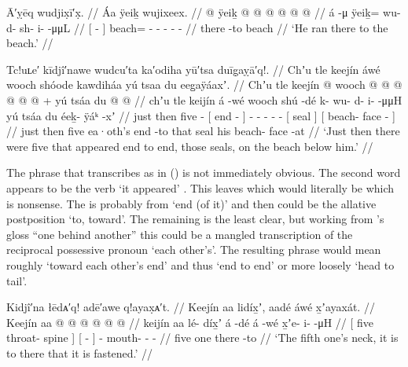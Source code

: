 \ex\label{ex:90-42-ran-down-there}%
%
\begingl
	\glpreamble	Ā′ỵēq wudjix̣ī′x̣. //
	\glpreamble	Áa ÿeiḵ wujixeex. //
	\gla	{}  @ {} {}
		ÿeiḵ @  @ {} @ {} @ {} @ {} @ {} //
	\glb	{} á -μ {}
		ÿeiḵ= wu- d- sh- i-  -μμL //
	\glc	{}[  - {}]
		beach= - - - -  - //
	\gld	{} there -to {}
		beach  {} {} {} {} {} //
	\glft	‘He ran there to the beach.’
		//
\endgl
\xe

\ex\label{ex:90-43-ran-down-there}%
%
\begingl
	\glpreamble	Tc!uʟe′ kīdjî′nawe wudcu′ta ka′odiha yū′tsa duīg̣aỵā′q!. //
	\glpreamble	Chʼu tle keejín áwé wooch shóode kawdiháa yú tsaa du eeg̱aÿáaxʼ. //
	\gla	Chʼu tle keejín  @ {}
		{} wooch  @ {} {}
		 @ {} @ {} @ {} @ {} @ {} +
		{} yú tsáa {} 
		{} du  @ {} @ {} {} //
	\glb	chʼu tle keijín á -wé
		{} wooch shú -dé {}
		k- wu- d- i-  -μμH
		{} yú tsáa {}
		{} du éeḵ- ÿáᵏ -xʼ {} //
	\glc	just then five  -
		{}[  end - {}]
		- - - -  -
		{}[  seal {}]
		{}[  beach- face - {}] //
	\gld	just then five  {}
		{} ea·oth’s end -to {}
		 {} {} {} {} {}
		{} that seal {}
		{} his beach- face -at {} //
	\glft	‘Just then there were five that appeared end to end, those seals, on the beach below him.’
		//
\endgl
\xe

The phrase that \citeauthor{swanton:1909} transcribes as  in (\lastx) is not immediately obvious.
The second word appears to be the verb  ‘it appeared’ \parencite[12]{leer:1976}.
This leaves  which would literally be  which is nonsense.
The  is probably from  ‘end (of it)’ and then  could be the allative postposition  ‘to, toward’.
The remaining  is the least clear, but working from \citeauthor{swanton:1909}’s gloss “one behind another” this could be a mangled transcription of the reciprocal possessive pronoun  ‘each other’s’.
The resulting phrase  would mean roughly ‘toward each other’s end’ and thus ‘end to end’ or more loosely ‘head to tail’.

\ex\label{ex:90-44-fifth-neck-fastened}%
%
\begingl
	\glpreamble	Kidjî′na łēdᴀ′q! adē′awe q!ayax̣ᴀ′t. //
	\glpreamble	Keejín aa lidíx̱ʼ, aadé áwé x̱ʼayaxát. //
	\gla	{} Keejín aa  @ {} {}
		{}  @ {} {}  @ {} 
		 @ {} @ {} @ {} //
	\glb	{} keijín aa lé- díx̱ʼ {}
		{} á -dé {} á -wé
		x̱ʼe- i-  -μH //
	\glc	{}[ five  throat- spine {}]
		{}[  - {}]  -
		mouth- -  - //
	\gld	{} five one  {} {}
		{} there -to {}  {}
		 {} {} {} //
	\glft	‘The fifth one’s neck, it is to there that it is fastened.’
		//
\endgl
\xe

